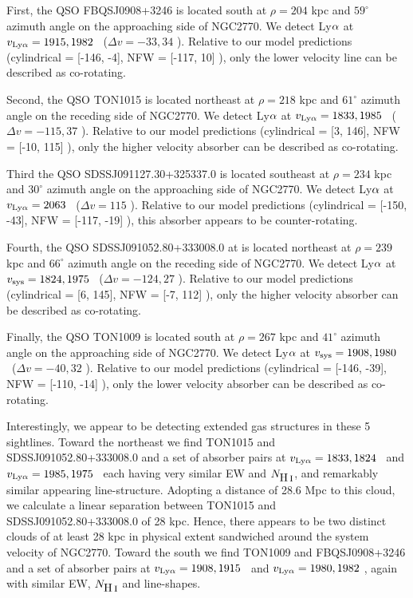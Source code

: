 First, the QSO FBQSJ0908+3246 is located south at $\rho = 204$ kpc and $59^{\circ}$ azimuth angle on the approaching side of NGC2770. We detect Ly$\rm \alpha$ at $v_{\rm Ly\alpha} = 1915, 1982$ \kms~($\Delta v = -33, 34$ \kms). Relative to our model predictions (cylindrical = [-146, -4], NFW = [-117, 10] \kms), only the lower velocity line can be described as co-rotating.

Second, the QSO TON1015 is located northeast at $\rho = 218$ kpc and $61^{\circ}$ azimuth angle on the receding side of NGC2770. We detect Ly$\rm \alpha$ at $v_{\rm Ly\alpha} = 1833, 1985$ \kms~($\Delta v = -115, 37$ \kms). Relative to our model predictions (cylindrical = [3, 146], NFW = [-10, 115] \kms), only the higher velocity absorber can be described as co-rotating.

Third the QSO SDSSJ091127.30+325337.0 is located southeast at $\rho = 234$ kpc and $30^{\circ}$ azimuth angle on the approaching side of NGC2770. We detect Ly$\rm \alpha$ at $v_{\rm Ly\alpha} = 2063$ \kms~($\Delta v = 115$ \kms). Relative to our model predictions (cylindrical = [-150, -43], NFW = [-117, -19] \kms), this absorber appears to be counter-rotating.

Fourth, the QSO SDSSJ091052.80+333008.0 at is located northeast at $\rho = 239$ kpc and $66^{\circ}$ azimuth angle on the receding side of NGC2770. We detect Ly$\rm \alpha$ at $v_{\rm sys} = 1824, 1975$ \kms~($\Delta v = -124, 27$ \kms). Relative to our model predictions (cylindrical = [6, 145], NFW = [-7, 112] \kms), only the higher velocity absorber can be described as co-rotating.

Finally, the QSO TON1009 is located south at $\rho = 267$ kpc and $41^{\circ}$ azimuth angle on the approaching side of NGC2770. We detect Ly$\rm \alpha$ at $v_{\rm sys} = 1908, 1980$ \kms~($\Delta v = -40, 32$ \kms). Relative to our model predictions (cylindrical = [-146, -39], NFW = [-110, -14] \kms), only the lower velocity absorber can be described as co-rotating.

Interestingly, we appear to be detecting extended gas structures in these 5 sightlines. Toward the northeast we find TON1015 and SDSSJ091052.80+333008.0 and a set of absorber pairs at $v_{\rm Ly\alpha} =1833, 1824$ \kms~and $v_{\rm Ly\alpha} = 1985, 1975$ \kms~each having very similar EW and $N_{\rm \mbox{H\,{\sc i}}}$, and remarkably similar appearing line-structure. Adopting a distance of 28.6 Mpc to this cloud, we calculate a linear separation between TON1015 and SDSSJ091052.80+333008.0 of 28 kpc. Hence, there appears to be two distinct clouds of at least 28 kpc in physical extent sandwiched around the system velocity of NGC2770. Toward the south we find TON1009 and FBQSJ0908+3246 and a set of absorber pairs at $v_{\rm Ly\alpha} =1908, 1915$ \kms~and $v_{\rm Ly\alpha} = 1980, 1982$ \kms, again with similar EW, $N_{\rm \mbox{H\,{\sc i}}}$ and line-shapes.

